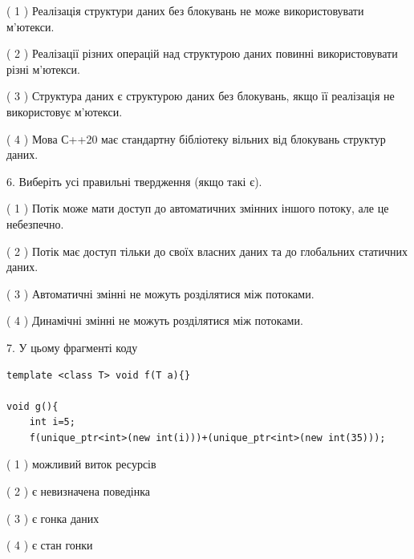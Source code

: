 \documentclass[12pt, ukrainian]{article}
\begin{document}
\begin {large}
{( 1 ) Реалізація структури даних без блокувань не може використовувати м’ютекси.%

( 2 ) Реалізації різних операцій над структурою даних повинні використовувати різні м’ютекси.%

( 3 ) Структура даних є структурою даних без блокувань, якщо її реалізація не використовує м’ютекси.%

( 4 ) Мова С++20 має стандартну бібліотеку вільних від блокувань структур даних.%
\newpage



\vspace{5mm}
6. Виберіть усі правильні твердження (якщо такі є).\par
\vspace{2mm}

( 1 ) Потік може мати доступ до автоматичних змінних іншого потоку, але це небезпечно.%

( 2 ) Потік має доступ тільки до своїх власних даних та до глобальних статичних даних.%

( 3 ) Автоматичні змінні не можуть розділятися між потоками.%

( 4 ) Динамічні змінні не можуть розділятися між потоками.%


\vspace{5mm}
7. У цьому фрагменті коду
\begin{verbatim}
template <class T> void f(T a){}

void g(){
    int i=5;
    f(unique_ptr<int>(new int(i)))+(unique_ptr<int>(new int(35)));
\end{verbatim}
( 1 ) можливий виток ресурсів%

( 2 ) є невизначена поведінка%

( 3 ) є гонка даних%

( 4 ) є стан гонки%
}
\end {large}
\end{document}
